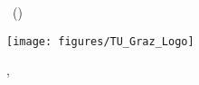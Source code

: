 

\thispagestyle{empty}  %
\large  %

\begin{center}
{\myauthor\, (\myid)}

\vfill

{\sffamily\bfseries\Huge \mytitle}

\vspace*{2cm}

{\mylecture}

\vfill

\texttt{[image: figures/TU\_Graz\_Logo]}

\vfill

\mysubmissiontown, \mysubmissionmonth~\mysubmissionyear

\end{center}
\normalsize %
